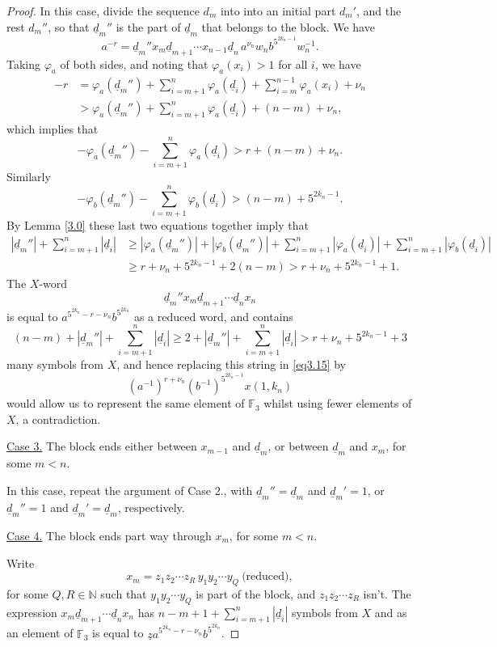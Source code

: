 \documentclass[twoside,11pt]{amsart}
\numberwithin{equation}{section}
\theoremstyle{definition}
\newcommand {\N}{\mathbb N}
\newcommand{\1}{\mathbbm{1}}
\newcommand{\F}{\mathbb F}
\newcommand{\pdt}{\underline}
\begin{document}
\begin{proof}
		In this case, divide the sequence $d_m$ into into an initial part $d_m'$, and the rest $d_m''$, so that $\pdt{d}_m''$ is the part of $\pdt{d}_m$ that belongs to the block. We have
		$$ a^{-r} = \pdt{d}_m''x_m \pdt{d}_{m+1} \cdots x_{n-1} \pdt{d}_n \, a^{\nu_n} w_n b^{5^{2k_n-1}} w_n^{-1}.$$
		Taking $\varphi_a$ of both sides, and noting that $\varphi_a(x_i) > 1$ for all $i$, we have
		\begin{align*}
			-r &= \varphi_a(\pdt{d}_m'')  +\sum_{i = m+1}^n \varphi_a(\pdt{d}_i) 
			+\sum_{i=m}^{n-1} \varphi_a(x_i) + \nu_n\\
			&> \varphi_a(\pdt{d}_m'')  +\sum_{i = m+1}^n \varphi_a(\pdt{d}_i) + (n-m) +\nu_n,
		\end{align*}
		which implies that
		$$ -\varphi_a(\pdt{d}_m'')  - \sum_{i = m+1}^n \varphi_a(\pdt{d}_i) > r +(n-m) +\nu_n.$$
		Similarly
		$$ -\varphi_b(\pdt{d}_m'')  -\sum_{i = m+1}^n \varphi_b(\pdt{d}_i) > (n-m) + 5^{2k_n-1}.$$
		By Lemma \ref{3.0} these last two equations together imply that  
		\begin{align*}
			|\pdt{d}_m''| + \sum_{i=m+1}^n |\pdt{d}_i | &\geq
			|\varphi_a(\pdt{d}_m'')| + |\varphi_b(\pdt{d}_m'')| + \sum_{i=m+1}^n |\varphi_a(\pdt{d}_i)| +  \sum_{i=m+1}^n |\varphi_b(\pdt{d}_i)|\\
			&\geq r+ \nu_n  + 5^{2k_n-1} + 2(n-m)> r + \nu_n +  5^{2k_n-1} + 1.
		\end{align*}
		The $X$-word
		$$\pdt{d}_m''x_m \pdt{d}_{m+1} \cdots \pdt{d}_n x_n$$
		is equal to $a^{5^{2k_n}-r - \nu_n}b^{5^{2k_n}}$ as a reduced word, and contains 
		$$(n-m) + |\pdt{d}_m''| + \sum_{i=m+1}^n |\pdt{d}_i | \geq 2 + |\pdt{d}_m''| + \sum_{i=m+1}^n |\pdt{d}_i | > r + \nu_n + 5^{2k_n-1} + 3$$
		many symbols from $X$,
		and hence replacing this string in \eqref{eq3.15} by
		$$(a^{-1})^{r +\nu_n} (b^{-1})^{5^{2k_n-1}} x(1,k_n)$$
		would allow us to represent the same element of $\F_3$ whilst using fewer elements of $X$, a contradiction.
		
		\vskip 2mm
		\noindent
		\underline{Case 3.} The block ends either between $x_{m-1}$ and $\pdt{d}_m$, or between $\pdt{d}_m$ and $x_m$, for some $m<n$.
		
		In this case, repeat the argument of Case 2., with $\pdt{d}_m'' = \pdt{d}_m$ and $\pdt{d}_m' = 1$, or $\pdt{d}_m'' = 1$ and $\pdt{d}_m' = \pdt{d}_m$, respectively.
		
		\vskip 2mm
		\noindent
		\underline{Case 4.} The block ends part way through $x_m$, for some $m<n$.
		
		Write 
		$$x_m = z_1z_2 \cdots z_R \, y_1 y_2 \cdots y_Q \ \text{(reduced)},$$
		for some $Q, R \in \N$ such that $y_1 y_2 \cdots y_Q$ is part of the block, and $z_1 z_2 \cdots z_R$ isn't. 
		The expression $x_m \pdt{d}_{m+1} \cdots \pdt{d}_n x_n$ has $n-m + 1 + \sum_{i=m+1}^n |\pdt{d}_i|$ symbols from $X$ and as an element of $\F_3$ is equal to $\pdt{z} a^{5^{2k_n}- r- \nu_n}b^{5^{2k_n}}$.
		

\end{proof}
\end{document}
